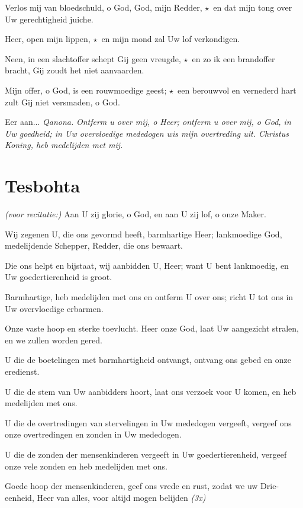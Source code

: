 \documentclass[12pt,twoside,a5paper]{article}
\newlength{\origparskip}
\newenvironment{halfparskip}{
  \setlength{\parskip}{0.5\origparskip}
}{
  \setlength{\parskip}{\origparskip}
}
\newcommand{\sep}{{\color{BrickRed} \textbf{$\star$}}}
\newcommand{\liturgicalhint}[1]{{\color{BrickRed}\footnotesize\itshape{#1}}}
\newcommand{\qanona}[1]{{\liturgicalhint{Qanona.}} \emph{#1}}
\newcommand{\markedsection}[1]{\section*{#1}\markboth{#1}{}}
\begin{document}
\begin{halfparskip}
  Verlos mij van bloedschuld, o God, God, mijn Redder, \sep\ en dat mijn tong over Uw gerechtigheid juiche.

  Heer, open mijn lippen, \sep\ en mijn mond zal Uw lof verkondigen.

  Neen, in een slachtoffer schept Gij geen vreugde, \sep\ en zo ik een brandoffer bracht, Gij zoudt het niet aanvaarden.

  Mijn offer, o God, is een rouwmoedige geest; \sep\ een berouwvol en vernederd hart zult Gij niet versmaden, o God.

  Eer aan... \qanona{Ontferm u over mij, o Heer; ontferm u over mij, o God, in Uw goedheid; in Uw overvloedige mededogen wis mijn overtreding uit. Christus Koning, heb medelijden met mij.}
\end{halfparskip}


\markedsection{Tesbohta}

\begin{halfparskip}
  \liturgicalhint{(voor recitatie:)} Aan U zij glorie, o God, en aan U zij lof, o onze Maker.

  Wij zegenen U, die ons gevormd heeft, barmhartige Heer; lankmoedige God, medelijdende Schepper, Redder, die ons bewaart.

  Die ons helpt en bijstaat, wij aanbidden U, Heer; want U bent lankmoedig, en Uw goedertierenheid is groot.

  Barmhartige, heb medelijden met ons en ontferm U over ons; richt U tot ons in Uw overvloedige erbarmen.

  Onze vaste hoop en sterke toevlucht. Heer onze God, laat Uw aangezicht stralen, en we zullen worden gered.

  U die de boetelingen met barmhartigheid ontvangt, ontvang ons gebed en onze eredienst.

  U die de stem van Uw aanbidders hoort, laat ons verzoek voor U komen, en heb medelijden met ons.

  U die de overtredingen van stervelingen in Uw mededogen vergeeft, vergeef ons onze overtredingen en zonden in Uw mededogen.

  U die de zonden der mensenkinderen vergeeft in Uw goedertierenheid, vergeef onze vele zonden en heb medelijden met ons.

  Goede hoop der mensenkinderen, geef ons vrede en rust, zodat we uw Drie-eenheid, Heer van alles, voor altijd mogen belijden \liturgicalhint{(3x)}
\end{halfparskip}
\end{document}
